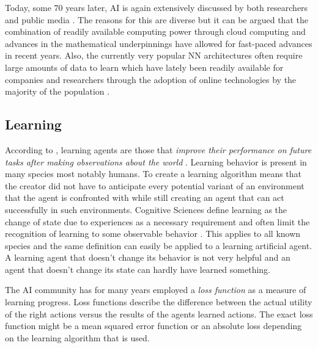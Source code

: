 Today, some 70 years later, \ac {AI} is again extensively discussed by both researchers and public media
\citep[p.24ff.]{russell2016artificial, arulkumaran2017brief}. The reasons for this are diverse but it can be argued that
the combination of readily available computing power through cloud computing and advances in the mathematical
underpinnings have allowed for fast-paced advances in recent years. Also, the currently very popular \acf {NN}
architectures often require large amounts of data to learn which have lately been readily available for companies and
researchers through the adoption of online technologies by the majority of the population
\citep[p.27]{russell2016artificial}.
\subsection{Learning}

According to \cite{russell2016artificial}, learning agents are those that \emph{improve their performance on future
tasks after making observations about the world} \cite[p.693]{russell2016artificial}. Learning behavior is present in
many species most notably humans. To create a learning algorithm means that the creator did not have to anticipate every
potential variant of an environment that the agent is confronted with while still creating an agent that can act
successfully in such environments. Cognitive Sciences define learning as the change of state due to experiences as a
necessary requirement and often limit the recognition of learning to some observable behavior
\cite[p.96f.]{cognition1999}. This applies to all known species and the same definition can easily be applied to a
learning artificial agent. A learning agent that doesn't change its behavior is not very helpful and an agent that
doesn't change its state can hardly have learned something. 

The \ac {AI} community has for many years employed a \emph{loss function} as a measure of learning progress. Loss
functions describe the difference between the actual utility of the right actions versus the results of the agents
learned actions. The exact loss function might be a mean squared error function or an absolute loss depending on the
learning algorithm that is used. 

